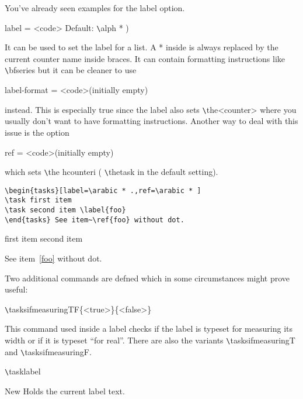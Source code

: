 \documentclass[a4paper,12pt,indent]{article}
\begin{document}
You’ve already seen examples for the label option.

label = {<code>} Default: \verb|\|\textcolor{Tasks}{alph *} )

It can be used to set the label for a list. A * inside is always replaced by the current counter
name inside braces. It can contain formatting instructions like \verb|\|\textcolor{Tasks}{bfseries} but it can be cleaner
to use

label-format = {<code>}\hfill (initially empty)

instead. This is especially true since the label also sets \verb|\|\textcolor{Tasks}{the<counter>} where you usually don’t
want to have formatting instructions. Another way to deal with this issue is the option

ref = {<code>}\hfill (initially empty)

which sets \verb|\|\textcolor{Tasks}{the hcounteri} ( \verb|\|\textcolor{Tasks}{thetask} in the default setting).

\begin{tcolorbox}[collower=black,colframe=Tasks,colback=white]
    \begin{lstlisting}
\begin{tasks}[label=\arabic * .,ref=\arabic * ]
\task first item
\task second item \label{foo}
\end{tasks} See item~\ref{foo} without dot.
\end{lstlisting}
        \tcblower
        \begin{tasks}[
            ]
            \task first item
            \task second item \label{foo}
            \end{tasks}
            See item~\ref{foo} without dot.
           \end{tcolorbox}

Two additional commands are defned which in some circumstances might prove useful:

\verb|\|\textcolor{Tasks}{tasksifmeasuringTF\{<true>\}\{<false>\}}

This command used inside a label checks if the label is typeset for measuring its width or if it is
typeset ``for real''. There are also the variants \verb|\|\textcolor{Tasks}{tasksifmeasuringT} and \verb|\|\textcolor{Tasks}{tasksifmeasuringF}.

\verb|\|\textcolor{Tasks}{tasklabel}

New Holds the current label text.
\end{document}
